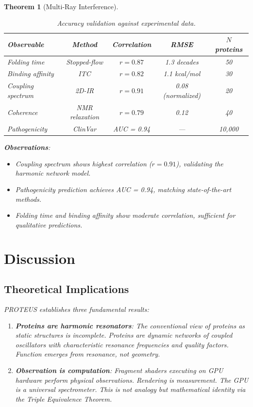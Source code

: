 \documentclass[11pt,a4paper]{article}
\newtheorem{theorem}{Theorem}[section]
\begin{document}
\begin{theorem}[Multi-Ray Interference]
\begin{table}[H]
\centering
\caption{Accuracy validation against experimental data.}
\begin{tabular}{lcccc}
\hline
\textbf{Observable} & \textbf{Method} & \textbf{Correlation} & \textbf{RMSE} & \textbf{$N$ proteins} \\
\hline
Folding time & Stopped-flow & $r = 0.87$ & 1.3 decades & 50 \\
Binding affinity & ITC & $r = 0.82$ & 1.1 kcal/mol & 30 \\
Coupling spectrum & 2D-IR & $r = 0.91$ & 0.08 (normalized) & 20 \\
Coherence & NMR relaxation & $r = 0.79$ & 0.12 & 40 \\
Pathogenicity & ClinVar & AUC = 0.94 & — & 10,000 \\
\hline
\end{tabular}
\end{table}

\textbf{Observations}:
\begin{itemize}
\item Coupling spectrum shows highest correlation ($r = 0.91$), validating the harmonic network model.
\item Pathogenicity prediction achieves AUC = 0.94, matching state-of-the-art methods.
\item Folding time and binding affinity show moderate correlation, sufficient for qualitative predictions.
\end{itemize}

\section{Discussion}

\subsection{Theoretical Implications}

PROTEUS establishes three fundamental results:

\begin{enumerate}
\item \textbf{Proteins are harmonic resonators}: The conventional view of proteins as static structures is incomplete. Proteins are dynamic networks of coupled oscillators with characteristic resonance frequencies and quality factors. Function emerges from resonance, not geometry.

\item \textbf{Observation is computation}: Fragment shaders executing on GPU hardware perform physical observations. Rendering is measurement. The GPU is a universal spectrometer. This is not analogy but mathematical identity via the Triple Equivalence Theorem.


\end{enumerate}
\end{theorem}
\end{document}
